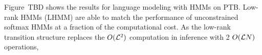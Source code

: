 \documentclass{article}
\begin{document}

Figure~TBD shows the results for language modeling with HMMs on \textsc{PTB}.
Low-rank HMMs (LHMM) are able to match the performance of unconstrained softmax HMMs
at a fraction of the computational cost.
As the low-rank transition structure replaces the $O(\mathcal{L}^2)$ computation
in inference with 2 $O(\mathcal{L} N)$ operations, 
\end{document}
